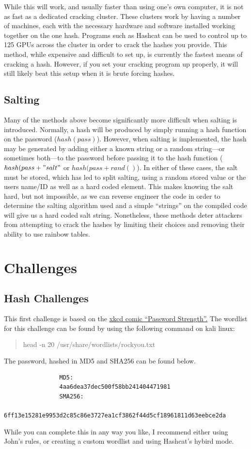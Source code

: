 \documentclass[a4paper,11pt]{report}
\begin{document}
			While this will work, and usually faster than using one's own computer, it is not as fast as a dedicated cracking cluster. 
			These clusters work by having a number of machines, each with the necessary hardware and software installed working together on the one hash. 
			Programs such as Hashcat can be used to control up to 125 GPUs across the cluster in order to crack the hashes you provide. 
			This method, while expensive and difficult to set up, is currently the fastest means of cracking a hash. 
			However, if you set your cracking program up properly, it will still likely beat this setup when it is brute forcing hashes. 
		\subsection{Salting}
			Many of the methods above become significantly more difficult when salting is introduced. 
			Normally, a hash will be produced by simply running a hash function on the password ($hash(pass)$). 
			However, when salting is implemented, the hash may be generated by adding either a known string or a random string---or sometimes both---to the password before passing it to the hash function ($hash(pass + "salt"$ or $hash(pass + rand()$).
			In either of these cases, the salt must be stored, which has led to split salting, using a random stored value or the users name/ID as well as a hard coded element. 
			This makes knowing the salt hard, but not impossible, as we can reverse engineer the code in order to determine the salting algorithm used and a simple ``strings'' on the compiled code will give us a hard coded salt string. 
			Nonetheless, these methods deter attackers from attempting to crack the hashes by limiting their choices and removing their ability to use rainbow tables. 
	\section{Challenges}
		\subsection{Hash Challenges}
			This first challenge is based on the \href{https://xkcd.com/936/}{xkcd comic ``Password Strength''.}
			The wordlist for this challenge can be found by using the following command on kali linux:
			\begin{quote}
				head -n 20 /usr/share/wordlists/rockyou.txt
			\end{quote}
			The password, hashed in MD5 and SHA256 can be found below. 
			\begin{verbatim}
				MD5: 
				4aa6dea37dec500f58bb241404471981
				SMA256: 
				6ff13e15281e9953d2c85c86e3727ea1cf3862f44d5cf18961811d63eebce2da 
			\end{verbatim}
			While you can complete this in any way you like, I recommend either using John's rules, or creating a custom wordlist and using Hashcat's hybird mode. 
\end{document}
